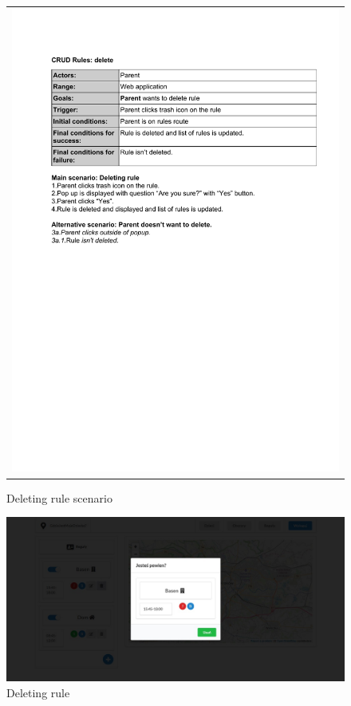 \documentclass{sprawozdanie-agh}
\begin{document}
    	\begin{figure}[H]
    		\centering
    		\begin{tabular}{c}
    			\includegraphics[width=.80\textwidth]{deR_cropped}
    		\end{tabular}
    		\caption{Deleting rule scenario}
    	\end{figure}

    	\begin{figure}[H]
    		\centering
    		\includegraphics[width=.80\textwidth]{deleteRule}
    		\caption{Deleting rule}
    	\end{figure}
\end{document}
